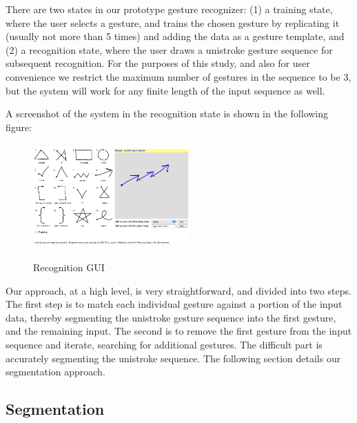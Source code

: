 \documentclass[twoside]{article}
\begin{document}
\begin{multicols}{2}

There are two states in our prototype gesture recognizer: (1) a training state,
where the user selects a gesture, and trains the chosen gesture by replicating
it (usually not more than 5 times) and adding the data as a gesture template, and (2) a recognition state, where
the user draws a unistroke gesture sequence for subsequent recognition. For the purposes of this study, and also for user convenience we restrict the maximum number of gestures in the sequence to be 3, but the system will work for any finite length of the input sequence as well.

A screenshot of the system in the recognition state is shown in the following figure:

\begin{figure}[H]
	\centering
	\includegraphics[height=4cm, width=6cm]{Images/GUI.png}
	\label{fig1}
	\caption{Recognition GUI}
\end{figure}
  
Our approach, at a high level, is very straightforward, and divided into two
steps. The first step is to match each individual gesture against a portion
of the input data, thereby segmenting the unistroke gesture sequence into the
first gesture, and the remaining input. The second is to remove the first
gesture from the input sequence and iterate, searching for additional gestures.
The difficult part is accurately segmenting the unistroke sequence. The following
section details our segmentation approach.

\subsection*{Segmentation}


\end{multicols}
\end{document}
